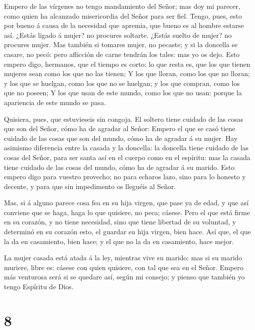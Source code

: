  Empero de las vírgenes no tengo mandamiento del Señor; mas
doy mi parecer, como quien ha alcanzado misericordia del Señor para ser
fiel.  Tengo, pues, esto por bueno á causa de la necesidad
que apremia, que bueno es al hombre estarse así.  ¿Estás
ligado á mujer? no procures soltarte. ¿Estás suelto de mujer? no
procures mujer.  Mas también si tomares mujer, no pecaste;
y si la doncella se casare, no pecó: pero aflicción de carne tendrán los
tales: mas yo os dejo.  Esto empero digo, hermanos, que el
tiempo es corto: lo que resta es, que los que tienen mujeres sean como
los que no las tienen;  Y los que lloran, como los que no
lloran; y los que se huelgan, como los que no se huelgan; y los que
compran, como los que no poseen;  Y los que usan de este
mundo, como los que no usan: porque la apariencia de este mundo se pasa.

 Quisiera, pues, que estuvieseis sin congoja. El soltero
tiene cuidado de las cosas que son del Señor, cómo ha de agradar al
Señor:  Empero el que se casó tiene cuidado de las cosas
que son del mundo, cómo ha de agradar á su mujer.  Hay
asimismo diferencia entre la casada y la doncella: la doncella tiene
cuidado de las cosas del Señor, para ser santa así en el cuerpo como en
el espíritu: mas la casada tiene cuidado de las cosas del mundo, cómo ha
de agradar á su marido.  Esto empero digo para vuestro
provecho; no para echaros lazo, sino para lo honesto y decente, y para
que sin impedimento os lleguéis al Señor.

 Mas, si á alguno parece cosa fea en su hija virgen, que
pase ya de edad, y que así conviene que se haga, haga lo que quisiere,
no peca; cásese.  Pero el que está firme en su corazón, y
no tiene necesidad, sino que tiene libertad de su voluntad, y determinó
en su corazón esto, el guardar su hija virgen, bien hace. 
Así que, el que la da en casamiento, bien hace; y el que no la da en
casamiento, hace mejor.

 La mujer casada está atada á la ley, mientras vive su
marido; mas si su marido muriere, libre es: cásese con quien quisiere,
con tal que sea en el Señor.  Empero más venturosa será si
se quedare así, según mi consejo; y pienso que también yo tengo Espíritu
de Dios.

\hypertarget{section-7}{%
\section{8}\label{section-7}}

